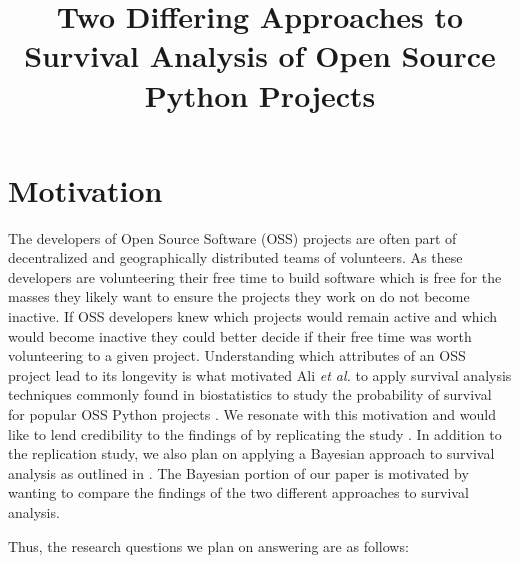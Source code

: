 \documentclass[conference]{IEEEtran}
\begin{document}


\title{Two Differing Approaches to Survival Analysis of Open Source Python Projects}

\author{
}

\maketitle

\section{Motivation}

The developers of Open Source Software (OSS) projects are often part of decentralized and geographically distributed teams of volunteers. As these developers are volunteering their free time to build software which is free for the masses they likely want to ensure the projects they work on do not become inactive. If OSS developers knew which projects would remain active and which would become inactive they could better decide if their free time was worth volunteering to a given project. Understanding which attributes of an OSS project lead to its longevity is what motivated Ali \emph{et al.} to apply survival analysis techniques commonly found in biostatistics to study the probability of survival for popular OSS Python projects \cite{ali2020cheating}. We resonate with this motivation and would like to lend credibility to the findings of \cite{ali2020cheating} by replicating the study . In addition to the replication study, we also plan on applying a Bayesian approach to survival analysis as outlined in \cite{kelter2020bayesian}. The Bayesian portion of our paper is motivated by wanting to compare the findings of the two different approaches to survival analysis.

Thus, the research questions we plan on answering are as follows:
\end{document}
